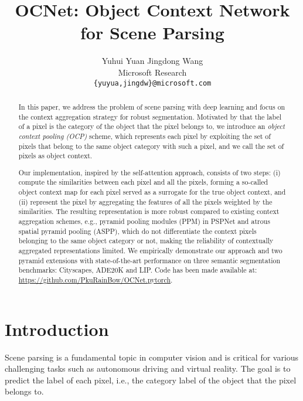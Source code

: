 \documentclass[10pt,twocolumn,letterpaper]{article}
\begin{document}
\title{OCNet: Object Context Network for Scene Parsing}

\author{Yuhui Yuan \quad Jingdong Wang\\
Microsoft Research\\
{\tt\small \{yuyua,jingdw\}@microsoft.com}
}

\maketitle

\begin{abstract}
In this paper,
we address the problem of scene parsing
with deep learning
and focus on the context aggregation strategy 
for robust segmentation. 
Motivated by
that the label of a pixel is 
the category of the object that the pixel belongs to,
we introduce
an \emph{object context pooling (OCP)} scheme,
which represents each pixel
by exploiting the set of pixels 
that belong to the same object category 
with such a pixel,
and we call the set of pixels as object context.

Our implementation, inspired by the self-attention approach,
consists of two steps:
(i) compute the similarities
between each pixel and all the pixels,
forming a so-called object context map for each pixel
served as a surrogate for the true object context,
and (ii) represent the pixel
by aggregating the features
of all the pixels 
weighted by the similarities.
The resulting representation is more robust 
compared to existing context aggregation schemes,
e.g., pyramid pooling modules (PPM) in PSPNet
and atrous spatial pyramid pooling (ASPP),
which do not differentiate the context pixels 
belonging to the same object category or not,
making the reliability of contextually aggregated representations limited. 
We empirically demonstrate our approach 
and two pyramid extensions 
with state-of-the-art performance on 
three semantic segmentation benchmarks: Cityscapes, ADE20K and LIP.
Code has been made available at: \url{https://github.com/PkuRainBow/OCNet.pytorch}.
\end{abstract}

\section{Introduction}
Scene parsing is a fundamental topic in computer vision 
and is critical for various challenging tasks such as autonomous driving and virtual reality.
The goal is to predict the label of each pixel,
i.e., the category label of the object that the pixel belongs to.
\end{document}
